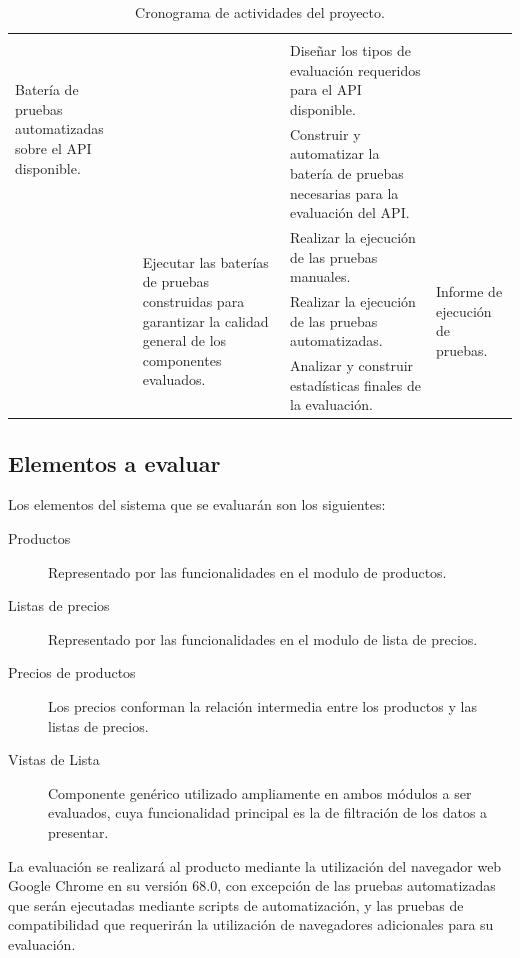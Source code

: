 \begin{table}
\begin{tabular}{|l|l|p{6.5cm}|l|}
\multirow{3}{4.0cm}{Batería de pruebas automatizadas sobre el API disponible.} \\
\cline{3-3}
& & Diseñar los tipos de evaluación requeridos para el API disponible. & \\
\cline{3-3}
& & Construir y automatizar la batería de pruebas necesarias para la evaluación del API. & \\
\cline{2-4}
& \multirow{3}{4.0cm}{Ejecutar las baterías de pruebas construidas para garantizar la calidad general de los componentes evaluados.} &
Realizar la ejecución de las pruebas manuales. &
\multirow{3}{4.0cm}{Informe de ejecución de pruebas.} \\
\cline{3-3}
& & Realizar la ejecución de las pruebas automatizadas. & \\
\cline{3-3}
& & Analizar y construir estadísticas finales de la evaluación. & \\
\hline
\end{tabular}
\caption{Cronograma de actividades del proyecto.}
\label{cronograma}
\end{table}

\subsection{Elementos a evaluar}
Los elementos del sistema que se evaluarán son los siguientes:

\begin{description}
\item [Productos] Representado por las funcionalidades en el modulo de productos.
\item [Listas de precios] Representado por las funcionalidades en el modulo de
    lista de precios.
\item [Precios de productos] Los precios conforman la relación intermedia entre
    los productos y las listas de precios.
\item [Vistas de Lista] Componente genérico utilizado ampliamente en ambos
    módulos a ser evaluados, cuya funcionalidad principal es la de filtración de
    los datos a presentar.
\end{description}

La evaluación se realizará al producto mediante la utilización del navegador
web Google Chrome en su versión 68.0, con excepción de las pruebas automatizadas
que serán ejecutadas mediante scripts de automatización, y las pruebas de
compatibilidad que requerirán la utilización de navegadores adicionales para su
evaluación.

